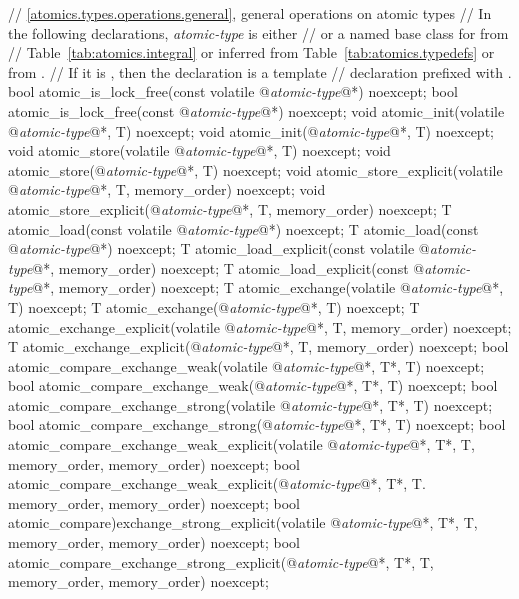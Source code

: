 \begin{codeblock}
{  // \ref{atomics.types.operations.general}, general operations on atomic types
  //  In the following declarations, \textit{atomic-type} is either
  //   or a named base class for  from
  //  Table~\ref{tab:atomics.integral} or inferred from Table~\ref{tab:atomics.typedefs} or from .
  // If it is , then the declaration is a template
  // declaration prefixed with .
  bool atomic_is_lock_free(const volatile @\textit{atomic-type}@*) noexcept;
  bool atomic_is_lock_free(const @\textit{atomic-type}@*) noexcept;
  void atomic_init(volatile @\textit{atomic-type}@*, T) noexcept;
  void atomic_init(@\textit{atomic-type}@*, T) noexcept;
  void atomic_store(volatile @\textit{atomic-type}@*, T) noexcept;
  void atomic_store(@\textit{atomic-type}@*, T) noexcept;
  void atomic_store_explicit(volatile @\textit{atomic-type}@*, T, memory_order) noexcept;
  void atomic_store_explicit(@\textit{atomic-type}@*, T, memory_order) noexcept;
  T atomic_load(const volatile @\textit{atomic-type}@*) noexcept;
  T atomic_load(const @\textit{atomic-type}@*) noexcept;
  T atomic_load_explicit(const volatile @\textit{atomic-type}@*, memory_order) noexcept;
  T atomic_load_explicit(const @\textit{atomic-type}@*, memory_order) noexcept;
  T atomic_exchange(volatile @\textit{atomic-type}@*, T) noexcept;
  T atomic_exchange(@\textit{atomic-type}@*, T) noexcept;
  T atomic_exchange_explicit(volatile @\textit{atomic-type}@*, T, memory_order) noexcept;
  T atomic_exchange_explicit(@\textit{atomic-type}@*, T, memory_order) noexcept;
  bool atomic_compare_exchange_weak(volatile @\textit{atomic-type}@*, T*, T) noexcept;
  bool atomic_compare_exchange_weak(@\textit{atomic-type}@*, T*, T) noexcept;
  bool atomic_compare_exchange_strong(volatile @\textit{atomic-type}@*, T*, T) noexcept;
  bool atomic_compare_exchange_strong(@\textit{atomic-type}@*, T*, T) noexcept;
  bool atomic_compare_exchange_weak_explicit(volatile @\textit{atomic-type}@*, T*, T,
    memory_order, memory_order) noexcept;
  bool atomic_compare_exchange_weak_explicit(@\textit{atomic-type}@*, T*, T.
    memory_order, memory_order) noexcept;
  bool atomic_compare)exchange_strong_explicit(volatile @\textit{atomic-type}@*, T*, T,
    memory_order, memory_order) noexcept;
  bool atomic_compare_exchange_strong_explicit(@\textit{atomic-type}@*, T*, T,
    memory_order, memory_order) noexcept;

}
\end{codeblock}
